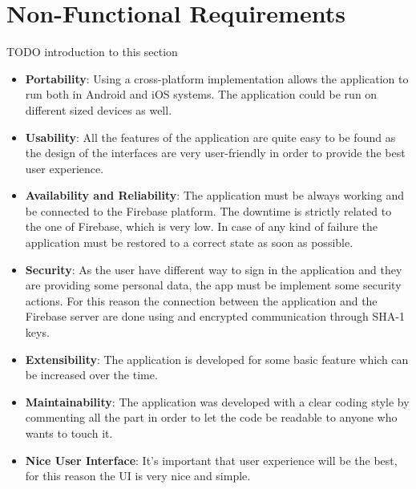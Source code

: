 \section{Non-Functional Requirements}
TODO introduction to this section
\begin{itemize}
	\item \textbf{Portability}: Using a cross-platform implementation allows the application to run both in Android and iOS systems. The application could be run on different sized devices as well.
	
	\item \textbf{Usability}: All the features of the application are quite easy to be found as the design of the interfaces are very user-friendly in order to provide the best user experience.
	
	\item \textbf{Availability and Reliability}: The application must be always working and be connected to the Firebase platform.
	The downtime is strictly related to the one of Firebase, which is very low.
	In case of any kind of failure the application must be restored to a correct state as soon as possible.
	
	\item \textbf {Security}: As the user have different way to sign in the application and they are providing some personal data, the app must be implement some security actions. For this reason the connection between the application and the Firebase server are done using and encrypted communication through SHA-1 keys.
	
	\item \textbf{Extensibility}: The application is developed for some basic feature which can be increased over the time.
	
	\item \textbf{Maintainability}: The application was developed with a clear coding style by commenting all the part in order to let the code be readable to anyone who wants to touch it.
	
	\item \textbf{Nice User Interface}: It's important that user experience will be the best, for this reason the UI is very nice and simple.
\end{itemize}

